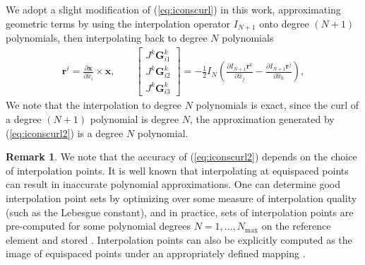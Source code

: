\documentclass[preprint,10pt]{article}
\theoremstyle{definition}
\theoremstyle{lemma}
\newtheorem*{remark}{Remark}
\theoremstyle{theorem}
\theoremstyle{assumption}
\renewcommand{\hat}{\widehat}
\newcommand{\pd}[2]{\frac{\partial#1}{\partial#2}}
\newcommand{\LRp}[1]{\left( #1 \right)}
\newcommand{\LRs}[1]{\left[ #1 \right]}
\begin{document}
{We adopt a slight modification of (\ref{eq:iconscurl}) in this work, approximating geometric terms by using the interpolation operator $I_{N+1}$ onto degree $(N+1)$ polynomials, then interpolating back to degree $N$ polynomials 
\begin{align}
\bm{r}^i = { \pd{\bm{x}}{\hat{x}_i}\times \bm{x}}, \qquad 
\LRs{\begin{array}{c}
J^k\bm{G}^k_{i1}\\
J^k\bm{G}^k_{i2}\\
J^k\bm{G}^k_{i3}\end{array}} = -\frac{1}{2}I_{N}\LRp{\pd{I_{N+1}\bm{r}^k}{\hat{x}_j}-\pd{I_{N+1}\bm{r}^j}{\hat{x}_k}}, 
\label{eq:iconscurl2}
\end{align}
We note that the interpolation to degree $N$ polynomials is exact, since the curl of a degree $(N+1)$ polynomial is degree $N$, the approximation generated by (\ref{eq:iconscurl2}) is a degree $N$ polynomial.  

\begin{remark}
We note that the accuracy of (\ref{eq:iconscurl2}) depends on the choice of interpolation points.  It is well known that interpolating at equispaced points can result in inaccurate polynomial approximations.  One can determine good interpolation point sets by optimizing over some measure of interpolation quality (such as the Lebesgue constant), and in practice, sets of interpolation points are pre-computed for some polynomial degrees $N = 1,\ldots, N_{\max}$ on the reference element and stored \cite{chen1996optimal, hesthaven1998electrostatics}. Interpolation points can also be explicitly computed as the image of equispaced points under an appropriately defined mapping \cite{blyth2006lobatto, warburton2006explicit, chan2015comparison}.  
\end{remark}

}
\end{document}

